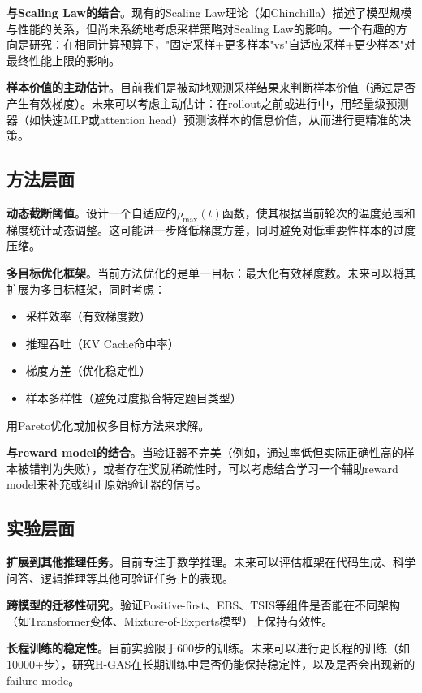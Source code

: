 \textbf{与Scaling Law的结合}。现有的Scaling Law理论（如Chinchilla）描述了模型规模与性能的关系，但尚未系统地考虑采样策略对Scaling Law的影响。一个有趣的方向是研究：在相同计算预算下，"固定采样+更多样本"vs"自适应采样+更少样本"对最终性能上限的影响。

\textbf{样本价值的主动估计}。目前我们是被动地观测采样结果来判断样本价值（通过是否产生有效梯度）。未来可以考虑主动估计：在rollout之前或进行中，用轻量级预测器（如快速MLP或attention head）预测该样本的信息价值，从而进行更精准的决策。

\subsection{方法层面}
\label{subsec:future_method}

\textbf{动态截断阈值}。设计一个自适应的$\rho_{\max}(t)$函数，使其根据当前轮次的温度范围和梯度统计动态调整。这可能进一步降低梯度方差，同时避免对低重要性样本的过度压缩。

\textbf{多目标优化框架}。当前方法优化的是单一目标：最大化有效梯度数。未来可以将其扩展为多目标框架，同时考虑：
\begin{itemize}
    \item 采样效率（有效梯度数）
    \item 推理吞吐（KV Cache命中率）
    \item 梯度方差（优化稳定性）
    \item 样本多样性（避免过度拟合特定题目类型）
\end{itemize}

用Pareto优化或加权多目标方法来求解。

\textbf{与reward model的结合}。当验证器不完美（例如，通过率低但实际正确性高的样本被错判为失败），或者存在奖励稀疏性时，可以考虑结合学习一个辅助reward model来补充或纠正原始验证器的信号。

\subsection{实验层面}
\label{subsec:future_experiment}

\textbf{扩展到其他推理任务}。目前专注于数学推理。未来可以评估框架在代码生成、科学问答、逻辑推理等其他可验证任务上的表现。

\textbf{跨模型的迁移性研究}。验证Positive-first、EBS、TSIS等组件是否能在不同架构（如Transformer变体、Mixture-of-Experts模型）上保持有效性。

\textbf{长程训练的稳定性}。目前实验限于600步的训练。未来可以进行更长程的训练（如10000+步），研究H-GAS在长期训练中是否仍能保持稳定性，以及是否会出现新的failure mode。

